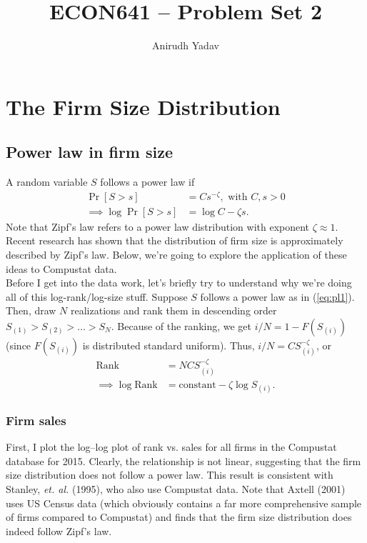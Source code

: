 \documentclass[12pt]{article}
\title{ECON641 -- Problem Set 2}
\author{Anirudh Yadav}
\begin{document}
\maketitle

\setcounter{tocdepth}{2}
\tableofcontents

\newpage

\section{The Firm Size Distribution}

\subsection{Power law in firm size}
A random variable $S$ follows a power law if
\begin{align}
\Pr[S>s] &= Cs^{-\zeta}, \text{ with } C, s>0 \label{eq:pl1}\\
\implies \log \Pr[S>s] &= \log C- \zeta s. \nonumber
\end{align}
Note that Zipf's law refers to a power law distribution with exponent $\zeta \approx 1$. Recent research has shown that the distribution of firm size is approximately described by Zipf's law. Below, we're going to explore the application of these ideas to Compustat data.\\

Before I get into the data work, let's briefly try to understand why we're doing all of this log-rank/log-size stuff. Suppose $S$ follows a power law as in (\ref{eq:pl1}). Then, draw $N$ realizations and rank them in descending order $S_{(1)} > S_{(2)} > ... > S_{N}$. Because of the ranking, we get $i/N = 1- F(S_{(i)})$ (since $F(S_{(i)})$ is distributed standard uniform). Thus, $i/N = CS_{(i)}^{-\zeta}$, or
\begin{align*}
\text{Rank}& = NCS_{(i)}^{-\zeta}\\
\implies \log \text{Rank} &= \text{constant} - \zeta \log S_{(i)}.
\end{align*}

\subsubsection{Firm sales}
First, I plot the log--log plot of rank vs. sales for all firms in the Compustat database for 2015. Clearly, the relationship is not linear, suggesting that the firm size distribution does not follow a power law. This result is consistent with Stanley, \textit{et. al.} (1995), who also use Compustat data. Note that Axtell (2001) uses US Census data (which obviously contains a far more comprehensive sample of firms compared to Compustat) and finds that the firm size distribution does indeed follow Zipf's law.
\end{document}
